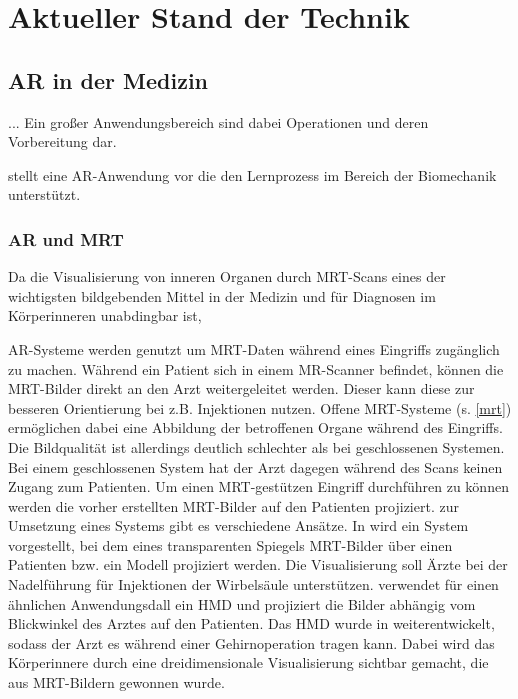 
\chapter{Aktueller Stand der Technik}
\label{grundlagen}
\section{AR in der Medizin}												 %
...
Ein großer Anwendungsbereich sind dabei Operationen und deren Vorbereitung dar. 

\cite{Voinea16} stellt eine AR-Anwendung vor die den Lernprozess im Bereich der Biomechanik unterstützt.


\subsection{AR und MRT}

Da die Visualisierung von inneren Organen durch MRT-Scans eines der wichtigsten bildgebenden Mittel in der Medizin und für Diagnosen im Körperinneren unabdingbar ist, 


AR-Systeme werden genutzt um MRT-Daten während eines Eingriffs zugänglich zu machen. Während ein Patient sich in einem MR-Scanner befindet, können die MRT-Bilder direkt an den Arzt weitergeleitet werden. Dieser kann diese zur besseren Orientierung bei z.B. Injektionen nutzen. Offene MRT-Systeme (s. \ref{mrt}) ermöglichen dabei eine Abbildung der betroffenen Organe während des Eingriffs. Die Bildqualität ist allerdings deutlich schlechter als bei geschlossenen Systemen. Bei einem geschlossenen System hat der Arzt dagegen während des Scans keinen Zugang zum Patienten. Um einen MRT-gestützen Eingriff durchführen zu können werden die vorher erstellten MRT-Bilder auf den Patienten projiziert. zur Umsetzung eines Systems gibt es verschiedene Ansätze.
In \cite{Fritz2012} wird ein System vorgestellt, bei dem eines transparenten Spiegels MRT-Bilder über einen Patienten bzw. ein Modell projiziert werden. Die Visualisierung soll Ärzte bei der Nadelführung für Injektionen der Wirbelsäule unterstützen. 
\cite{khamene03} verwendet für einen ähnlichen Anwendungsdall ein HMD und projiziert die Bilder abhängig vom Blickwinkel des Arztes auf den Patienten. Das HMD wurde in \cite{khamene01} weiterentwickelt, sodass der Arzt es während einer Gehirnoperation tragen kann. Dabei wird das Körperinnere durch eine dreidimensionale Visualisierung sichtbar gemacht, die aus MRT-Bildern gewonnen wurde. 


